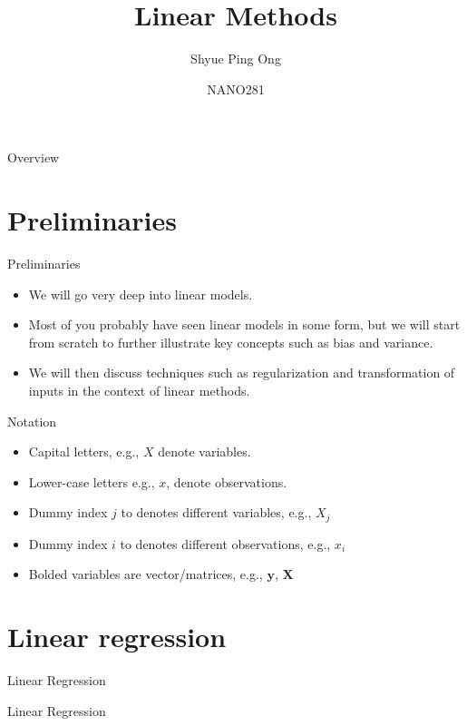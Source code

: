 \documentclass[aspectratio=169]{beamer}
\title[Linear Methods]{Linear Methods}
\author{Shyue Ping Ong}
\institute[UCSD]{University of California, San Diego\\
\medskip
}
\date{NANO281}
\let \vec \mathbf
\begin{document}
\begin{frame}
    \titlepage %
\end{frame}


\begin{frame}{Overview}
    \tableofcontents
\end{frame}


\section{Preliminaries}

\begin{frame}{Preliminaries}
    \begin{itemize}
        \item We will go very deep into linear models.
        \item Most of you probably have seen linear models in some form, but we will start from scratch to further illustrate key concepts such as bias and variance.
        \item We will then discuss techniques such as regularization and transformation of inputs in the context of linear methods.
    \end{itemize}
\end{frame}

\begin{frame}{Notation}
    \begin{itemize}
        \item Capital letters, e.g., $X$ denote variables.
        \item Lower-case letters e.g., $x$, denote observations.
        \item Dummy index $j$ to denotes different variables, e.g., $X_j$
        \item Dummy index $i$ to denotes different observations, e.g., $x_i$
        \item Bolded variables are vector/matrices, e.g., $\vec{y}$, $\vec{X}$
    \end{itemize}
\end{frame}

\section{Linear regression}

\begin{frame}{Linear Regression}
    \Huge{\centerline{Linear Regression}}
\end{frame} 
\end{document}
